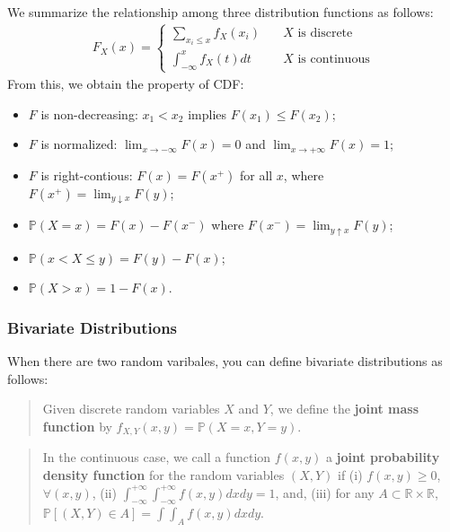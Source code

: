 \documentclass[
  12pt,
]{article}
\providecommand{\tightlist}{%
  \setlength{\itemsep}{0pt}\setlength{\parskip}{0pt}}
\begin{document}
We summarize the relationship among three distribution functions as
follows: \begin{align*}
  F_X(x) =
  \begin{cases}
    \sum_{x_i \le x} f_X(x_i)  &\quad\text{$X$ is discrete} \\
    \int_{-\infty}^x f_X(t)dt  &\quad\text{$X$ is continuous}
  \end{cases}
\end{align*} From this, we obtain the property of CDF:

\begin{itemize}
\tightlist
\item
  \(F\) is non-decreasing: \(x_1 < x_2\) implies \(F(x_1) \le F(x_2)\);
\item
  \(F\) is normalized: \(\lim_{x \to -\infty} F(x) = 0\) and
  \(\lim_{x \to +\infty} F(x) = 1\);
\item
  \(F\) is right-contious: \(F(x) = F(x^+)\) for all \(x\), where
  \(F(x^+) = \lim_{y \downarrow x} F(y)\);
\item
  \(\mathbb{P}(X = x) = F(x) - F(x^-)\) where
  \(F(x^-) = \lim_{y \uparrow x} F(y)\);
\item
  \(\mathbb{P}(x < X \le y) = F(y) - F(x)\);
\item
  \(\mathbb{P}(X > x) = 1 - F(x)\).
\end{itemize}

\hypertarget{bivariate-distributions}{%
\subsubsection{Bivariate Distributions}\label{bivariate-distributions}}

When there are two random varibales, you can define bivariate
distributions as follows:

\begin{quote}
Given discrete random variables \(X\) and \(Y\), we define the
\textbf{joint mass function} by
\(f_{X,Y}(x, y) = \mathbb{P}(X = x, Y = y)\).
\end{quote}

\begin{quote}
In the continuous case, we call a function \(f(x, y)\) a \textbf{joint
probability density function} for the random variables \((X, Y)\) if (i)
\(f(x, y) \ge 0\), \(\forall (x, y)\), (ii)
\(\int_{-\infty}^{+\infty} \int_{-\infty}^{+\infty} f(x, y)dx dy = 1\),
and, (iii) for any \(A \subset \mathbb{R} \times \mathbb{R}\),
\(\mathbb{P}[(X, Y) \in A] = \int \int_A f(x, y)dx dy\).
\end{quote}
\end{document}
